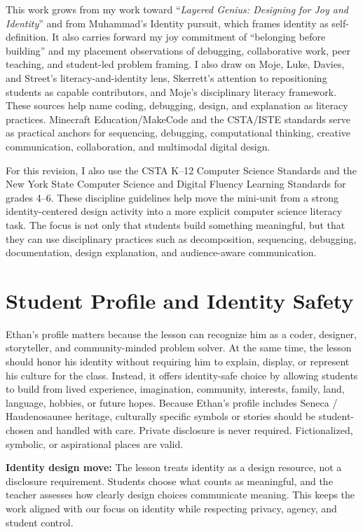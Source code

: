 This work grows from my work toward ``\emph{Layered Genius: Designing for Joy and Identity}'' and from Muhammad's Identity pursuit, which frames identity as self-definition. It also carries forward my joy commitment of ``belonging before building'' and my placement observations of debugging, collaborative work, peer teaching, and student-led problem framing. I also draw on Moje, Luke, Davies, and Street's literacy-and-identity lens, Skerrett's attention to repositioning students as capable contributors, and Moje's disciplinary literacy framework. These sources help name coding, debugging, design, and explanation as literacy practices. Minecraft Education/MakeCode and the CSTA/ISTE standards serve as practical anchors for sequencing, debugging, computational thinking, creative communication, collaboration, and multimodal digital design.

\textcolor{LessonTwoAccent}{For this revision, I also use the CSTA K--12 Computer Science Standards and the New York State Computer Science and Digital Fluency Learning Standards for grades 4--6. These discipline guidelines help move the mini-unit from a strong identity-centered design activity into a more explicit computer science literacy task. The focus is not only that students build something meaningful, but that they can use disciplinary practices such as decomposition, sequencing, debugging, documentation, design explanation, and audience-aware communication.}

\section*{Student Profile and Identity Safety}

Ethan's profile matters because the lesson can recognize him as a coder, designer, storyteller, and community-minded problem solver. At the same time, the lesson should honor his identity without requiring him to explain, display, or represent his culture for the class. Instead, it offers identity-safe choice by allowing students to build from lived experience, imagination, community, interests, family, land, language, hobbies, or future hopes. Because Ethan's profile includes Seneca / Haudenosaunee heritage, culturally specific symbols or stories should be student-chosen and handled with care. Private disclosure is never required. Fictionalized, symbolic, or aspirational places are valid.

\textbf{Identity design move:} The lesson treats identity as a design resource, not a disclosure requirement. Students choose what counts as meaningful, and the teacher assesses how clearly design choices communicate meaning. This keeps the work aligned with our focus on identity while respecting privacy, agency, and student control.

